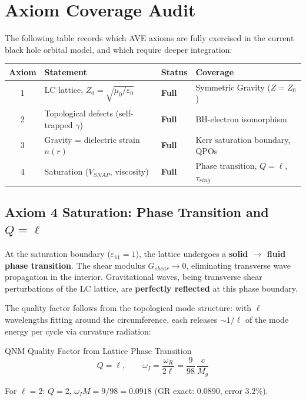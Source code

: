 \section{Axiom Coverage Audit}

The following table records which AVE axioms are fully exercised in the current black hole orbital model, and which require deeper integration:

\begin{center}
\renewcommand{\arraystretch}{1.3}
\begin{tabular}{c l l l}
\toprule
\textbf{Axiom} & \textbf{Statement} & \textbf{Status} & \textbf{Coverage} \\
\midrule
1 & LC lattice, $Z_0 = \sqrt{\mu_0/\varepsilon_0}$ & \textbf{Full} & Symmetric Gravity ($Z = Z_0$) \\
2 & Topological defects (self-trapped $\gamma$) & \textbf{Full} & BH-electron isomorphism \\
3 & Gravity = dielectric strain $n(r)$ & \textbf{Full} & Kerr saturation boundary, QPOs \\
4 & Saturation ($V_{SNAP}$, viscosity) & \textbf{Full} & Phase transition, $Q = \ell$, $\tau_{ring}$ \\
\bottomrule
\end{tabular}
\end{center}

\subsection{Axiom 4 Saturation: Phase Transition and $Q = \ell$}

At the saturation boundary ($\varepsilon_{11} = 1$), the lattice undergoes a \textbf{solid $\to$ fluid phase transition}. The shear modulus $G_{shear} \to 0$, eliminating transverse wave propagation in the interior. Gravitational waves, being transverse shear perturbations of the LC lattice, are \textbf{perfectly reflected} at this phase boundary.

The quality factor follows from the topological mode structure: with $\ell$ wavelengths fitting around the circumference, each releases $\sim 1/\ell$ of the mode energy per cycle via curvature radiation:
\begin{resultbox}{QNM Quality Factor from Lattice Phase Transition}
\begin{equation}
    Q = \ell, \qquad \omega_I = \frac{\omega_R}{2\ell} = \frac{9}{98}\,\frac{c}{M_g}
\end{equation}
\end{resultbox}
\noindent For $\ell = 2$: $Q = 2$, $\omega_I M = 9/98 = 0.0918$ (GR exact: $0.0890$, error $3.2\%$).

